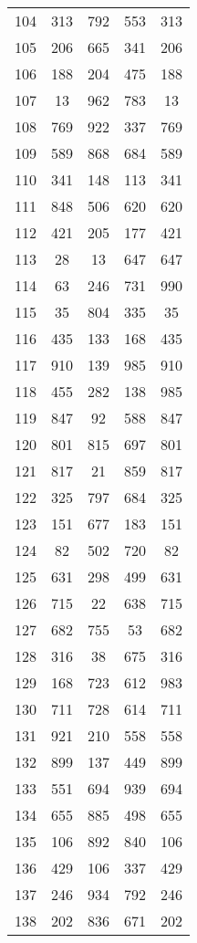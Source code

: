 \documentclass[a4paper,10pt,ngerman]{scrartcl}
\begin{document}
\begin{longtable}[c]{c|c|c|c|c}
    104 & 313 & 792 & 553 & 313 \\
    105 & 206 & 665 & 341 & 206 \\
    106 & 188 & 204 & 475 & 188 \\
    107 & 13 & 962 & 783 & 13 \\
    108 & 769 & 922 & 337 & 769 \\
    109 & 589 & 868 & 684 & 589 \\
    110 & 341 & 148 & 113 & 341 \\
    111 & 848 & 506 & 620 & 620 \\
    112 & 421 & 205 & 177 & 421 \\
    113 & 28 & 13 & 647 & 647 \\
    114 & 63 & 246 & 731 & 990 \\
    115 & 35 & 804 & 335 & 35 \\
    116 & 435 & 133 & 168 & 435 \\
    117 & 910 & 139 & 985 & 910 \\
    118 & 455 & 282 & 138 & 985 \\
    119 & 847 & 92 & 588 & 847 \\
    120 & 801 & 815 & 697 & 801 \\
    121 & 817 & 21 & 859 & 817 \\
    122 & 325 & 797 & 684 & 325 \\
    123 & 151 & 677 & 183 & 151 \\
    124 & 82 & 502 & 720 & 82 \\
    125 & 631 & 298 & 499 & 631 \\
    126 & 715 & 22 & 638 & 715 \\
    127 & 682 & 755 & 53 & 682 \\
    128 & 316 & 38 & 675 & 316 \\
    129 & 168 & 723 & 612 & 983 \\
    130 & 711 & 728 & 614 & 711 \\
    131 & 921 & 210 & 558 & 558 \\
    132 & 899 & 137 & 449 & 899 \\
    133 & 551 & 694 & 939 & 694 \\
    134 & 655 & 885 & 498 & 655 \\
    135 & 106 & 892 & 840 & 106 \\
    136 & 429 & 106 & 337 & 429 \\
    137 & 246 & 934 & 792 & 246 \\
    138 & 202 & 836 & 671 & 202 \\

\end{longtable}
\end{document}
